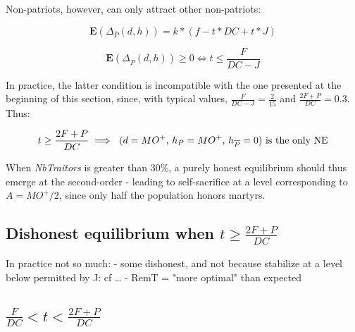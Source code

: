 \documentclass[a4paper,12pt]{report}
\begin{document}
Non-patriots, however, can only attract other non-patriots:

\[ \mathbf{E}(\Delta_{\overline{P}}(d,h)) = k*(f - t*DC +t*J) \]

\[ \mathbf{E}(\Delta_{\overline{P}}(d,h)) \geq 0 \iff t \leq \frac{F}{DC-J} \]

In practice, the latter condition is incompatible with the one presented at the beginning
of this section, since, with typical values, $\frac{F}{DC-J} = \frac{2}{15}$ and 
$\frac{2F+P}{DC} = 0.3$. Thus:

\begin{equation}
    \label{e:h_ESS}
    t \geq \frac{2F+P}{DC} \implies \textnormal{
        ($d=MO^{+}$, $h_P=MO^{+}$, $h_{\overline{P}}=0$) 
        is the only NE}
\end{equation}

When \emph{NbTraitors} is greater than 30\%, a purely honest equilibrium should thus
emerge at the second-order - leading to self-sacrifice at a level 
corresponding to $A = MO^+ / 2$, since only half the population honors martyrs.


\subsection{Dishonest equilibrium when $t \geq \frac{2F+P}{DC}$}
\label{s:_ESS}

In practice not so much: 
- some dishonest, and not because stabilize at a level below permitted by J: cf \dots
- RemT = "more optimal" than expected





\subsection{$\frac{F}{DC}<t<\frac{2F+P}{DC}$}



\end{document}
